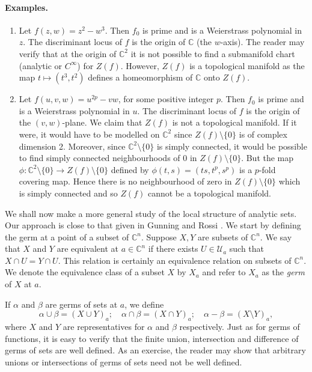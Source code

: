 \paragraph*{Examples.}
\begin{enumerate}
\item Let $f(z,w)=z^2-w^3$. Then $f_0$ is prime and is a Weierstrass polynomial in $z$. The discriminant locus of $f$ is the origin of $\mathbb C$ (the $w$-axis). The reader may verify that at the origin of $\mathbb C^2$ it is not possible to find a submanifold chart (analytic or $C^\infty$) for $Z(f)$. However, $Z(f)$ is a topological manifold as the map $t\mapsto(t^3,t^2)$ defines a homeomorphism of $\mathbb C$ onto $Z(f)$.
\item Let $f(u,v,w)=u^{2p}-vw$, for some positive integer $p$. Then $f_0$ is prime and is a Weierstrass polynomial in $u$. The discriminant locus
of $f$ is the origin of the $(v,w)$-plane. We claim that $Z(f)$ is not a topological manifold. If it were, it would have to be modelled on $\mathbb C^2$ since $Z(f)\setminus\{0\}$ is of complex dimension 2. Moreover, since $\mathbb C^2\setminus\{0\}$ is simply connected, it would be possible to find simply connected neighbourhoods of $0$ in $Z(f)\setminus\{0\}$. But the map $\phi:\mathbb C^2\setminus\{0\}\to Z(f)\setminus\{0\}$ defined by $\phi(t,s)=(ts,t^p,s^p)$ is a $p$-fold covering map. Hence there is no neighbourhood of zero in $Z(f)\setminus\{0\}$ which is simply connected and so $Z(f)$ cannot be a topological manifold.
\end{enumerate}
We shall now make a more general study of the local structure of analytic sets. Our approach is close to that given in Gunning and Rossi \cite{bib:I:gunning-r-c-and-rossi-h:1}. We start by defining the germ at a point of a subset of $\mathbb C^n$. Suppose $X,Y$ are subsets of $\mathbb C^n$. We say that $X$ and $Y$ are equivalent at $a\in\mathbb C^n$ if there exists $U\in\mathcal U_a$ such that $X\cap U=Y\cap U$. This relation is certainly an equivalence relation on subsets of $\mathbb C^n$. We denote the equivalence class of a subset $X$ by $X_a$ and refer to $X_a$ as the \emph{germ} of $X$ at $a$.

If $\alpha$ and $\beta$ are germs of sets at $a$, we define
\[\alpha\cup\beta=(X\cup Y)_a;\quad\alpha\cap\beta=(X\cap Y)_a;\quad\alpha-\beta=(X\setminus Y)_a,\]
where $X$ and $Y$ are representatives for $\alpha$ and $\beta$ respectively. Just as for germs of functions, it is easy to verify that the finite union, intersection and difference of germs of sets are well defined. As an exercise, the reader may show that arbitrary unions or intersections of germs of sets need not be well defined.

